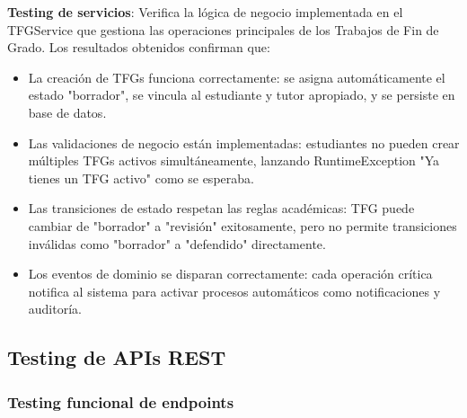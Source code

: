 \documentclass[12pt,a4paper,oneside]{report}
\begin{document}
\textbf{Testing de servicios}: Verifica la lógica de negocio implementada en el TFGService que gestiona las operaciones principales de los Trabajos de Fin de Grado. Los resultados obtenidos confirman que:
\begin{itemize}
\item La creación de TFGs funciona correctamente: se asigna automáticamente el estado "borrador", se vincula al estudiante y tutor apropiado, y se persiste en base de datos.
\item Las validaciones de negocio están implementadas: estudiantes no pueden crear múltiples TFGs activos simultáneamente, lanzando RuntimeException "Ya tienes un TFG activo" como se esperaba.
\item Las transiciones de estado respetan las reglas académicas: TFG puede cambiar de "borrador" a "revisión" exitosamente, pero no permite transiciones inválidas como "borrador" a "defendido" directamente.
\item Los eventos de dominio se disparan correctamente: cada operación crítica notifica al sistema para activar procesos automáticos como notificaciones y auditoría.
\end{itemize}

\subsection{Testing de APIs REST}\label{testing-de-apis-rest}

\subsubsection{Testing funcional de
endpoints}\label{testing-funcional-de-endpoints}
\end{document}
